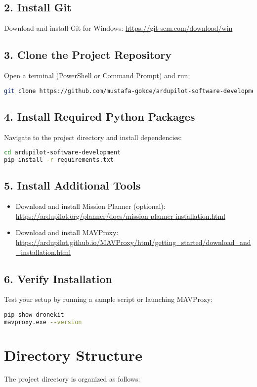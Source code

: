 \documentclass[12pt,a4paper]{report}
\begin{document}
\subsection*{2. Install Git}
Download and install Git for Windows: \url{https://git-scm.com/download/win}

\subsection*{3. Clone the Project Repository}
Open a terminal (PowerShell or Command Prompt) and run:
\begin{lstlisting}[language=bash]
git clone https://github.com/mustafa-gokce/ardupilot-software-development.git
\end{lstlisting}

\subsection*{4. Install Required Python Packages}
Navigate to the project directory and install dependencies:
\begin{lstlisting}[language=bash]
cd ardupilot-software-development
pip install -r requirements.txt
\end{lstlisting}

\subsection*{5. Install Additional Tools}
\begin{itemize}
    \item Download and install Mission Planner (optional): \url{https://ardupilot.org/planner/docs/mission-planner-installation.html}
    \item Download and install MAVProxy: \url{https://ardupilot.github.io/MAVProxy/html/getting_started/download_and_installation.html}
\end{itemize}

\subsection*{6. Verify Installation}
Test your setup by running a sample script or launching MAVProxy:
\begin{lstlisting}[language=bash]
pip show dronekit
mavproxy.exe --version
\end{lstlisting}

\section{Directory Structure}
The project directory is organized as follows:
\end{document}
